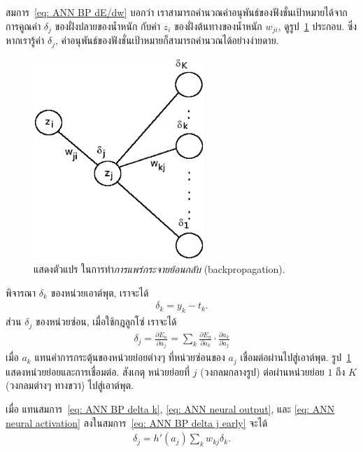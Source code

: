 สมการ~\ref{eq: ANN BP dE/dw} บอกว่า เราสามารถคำนวณค่าอนุพันธ์ของฟังชั่นเป้าหมายได้จาก การคูณค่า $\delta_j$ ของฝั่งปลายของน้ำหนัก 
กับค่า $z_i$ ของฝั่งต้นทางของน้ำหนัก $w_{ji}$, ดูรูป~\ref{fig: ANN backprop} ประกอบ.
ซึ่งหากเรารู้ค่า $\delta_j$, ค่าอนุพันธ์ของฟังชั่นเป้าหมายก็สามารถคำนวณได้อย่างง่ายดาย.

%
\begin{figure}
\begin{center}
\includegraphics[height=3in]{04ANN/bpneurons.eps}
\end{center}
\caption{แสดงตัวแปร ในการทำ\textit{การแพร่กระจายย้อนกลับ} (backpropagation).}
\label{fig: ANN backprop}
\end{figure}
%

พิจารณา $\delta_k$ ของหน่วยเอาต์พุต, เราจะได้
\begin{eqnarray}
   \delta_k = y_k - t_k.
\label{eq: ANN BP delta k}   
\end{eqnarray}
ส่วน $\delta_j$ ของหน่วยซ่อน, เมื่อใช้กฎลูกโซ่ เราจะได้
\begin{eqnarray}
   \delta_j = \frac{\partial E_n}{\partial a_j} 
   = \sum_k \frac{\partial E_n}{\partial a_k} \cdot \frac{\partial a_k}{\partial a_j}
\label{eq: ANN BP delta j early}   
\end{eqnarray}
เมื่อ $a_k$ แทนค่าการกระตุ้นของหน่วยย่อยต่างๆ ที่หน่วยซ่อนของ $a_j$ เชื่อมต่อผ่านไปสู่เอาต์พุต.
รูป~\ref{fig: ANN backprop} แสดงหน่วยย่อยและการเชื่อมต่อ.
สังเกตุ หน่วยย่อยที่ $j$ (วงกลมกลางรูป) ต่อผ่านหน่วยย่อย $1$ ถึง $K$ (วงกลมต่างๆ ทางขวา) ไปสู่เอาต์พุต.

เมื่อ แทนสมการ~\ref{eq: ANN BP delta k}, \ref{eq: ANN neural output}, และ \ref{eq: ANN neural activation} ลงในสมการ~\ref{eq: ANN BP delta j early} จะได้
\begin{eqnarray}
  \delta_j = h'(a_j) \sum_k w_{kj} \delta_k.
\label{eq: ANN BP delta j}
\end{eqnarray}

